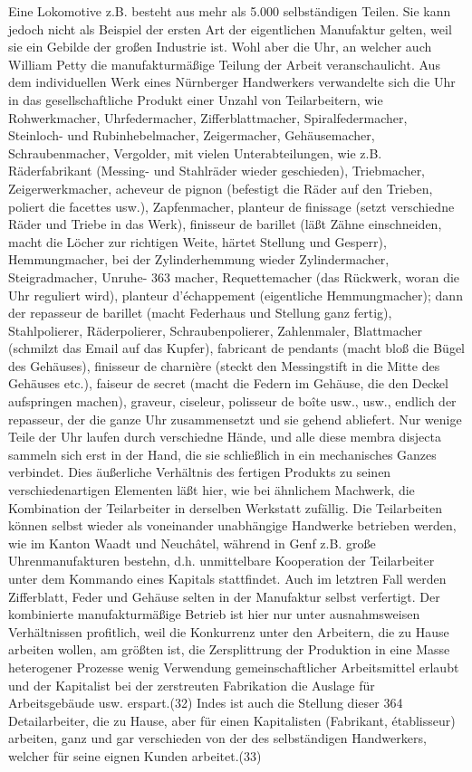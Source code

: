{Eine Lokomotive z.B. besteht aus mehr als 5.000 selbständigen Teilen.
Sie kann jedoch nicht als Beispiel der ersten Art der eigentlichen
Manufaktur gelten, weil sie ein Gebilde der großen Industrie ist. Wohl
aber die Uhr, an welcher auch William Petty die manufakturmäßige Teilung
der Arbeit veranschaulicht. Aus dem individuellen Werk eines Nürnberger
Handwerkers verwandelte sich die Uhr in das gesellschaftliche Produkt
einer Unzahl von Teilarbeitern, wie Rohwerkmacher, Uhrfedermacher,
Zifferblattmacher, Spiralfedermacher, Steinloch- und Rubinhebelmacher,
Zeigermacher, Gehäusemacher, Schraubenmacher, Vergolder, mit vielen
Unterabteilungen, wie z.B. Räderfabrikant (Messing- und Stahlräder
wieder geschieden), Triebmacher, Zeigerwerkmacher, acheveur de pignon
(befestigt die Räder auf den Trieben, poliert die facettes usw.),
Zapfenmacher, planteur de finissage (setzt verschiedne Räder und Triebe
in das Werk), finisseur de barillet (läßt Zähne einschneiden, macht die
Löcher zur richtigen Weite, härtet Stellung und Gesperr), Hemmungmacher,
bei der Zylinderhemmung wieder Zylindermacher, Steigradmacher, Unruhe-
\num{363} macher, Requettemacher (das Rückwerk, woran
die Uhr reguliert wird), planteur d'échappement (eigentliche
Hemmungmacher); dann der repasseur de barillet (macht Federhaus und
Stellung ganz fertig), Stahlpolierer, Räderpolierer, Schraubenpolierer,
Zahlenmaler, Blattmacher (schmilzt das Email auf das Kupfer), fabricant
de pendants (macht bloß die Bügel des Gehäuses), finisseur de charnière
(steckt den Messingstift in die Mitte des Gehäuses etc.), faiseur de
secret (macht die Federn im Gehäuse, die den Deckel aufspringen machen),
graveur, ciseleur, polisseur de boîte usw., usw., endlich der repasseur,
der die ganze Uhr zusammensetzt und sie gehend abliefert. Nur wenige
Teile der Uhr laufen durch verschiedne Hände, und alle diese membra
disjecta sammeln sich erst in der Hand, die sie schließlich in ein
mechanisches Ganzes verbindet. Dies äußerliche Verhältnis des fertigen
Produkts zu seinen verschiedenartigen Elementen läßt hier, wie bei
ähnlichem Machwerk, die Kombination der Teilarbeiter in derselben
Werkstatt zufällig. Die Teilarbeiten können selbst wieder als
voneinander unabhängige Handwerke betrieben werden, wie im Kanton Waadt
und Neuchâtel, während in Genf z.B. große Uhrenmanufakturen bestehn,
d.h. unmittelbare Kooperation der Teilarbeiter unter dem Kommando eines
Kapitals stattfindet. Auch im letztren Fall werden Zifferblatt, Feder
und Gehäuse selten in der Manufaktur selbst verfertigt. Der kombinierte
manufakturmäßige Betrieb ist hier nur unter ausnahmsweisen Verhältnissen
profitlich, weil die Konkurrenz unter den Arbeitern, die zu Hause
arbeiten wollen, am größten ist, die Zersplittrung der Produktion in
eine Masse heterogener Prozesse wenig Verwendung gemeinschaftlicher
Arbeitsmittel erlaubt und der Kapitalist bei der zerstreuten Fabrikation
die Auslage für Arbeitsgebäude usw. erspart.(32) Indes ist auch die
Stellung dieser \num{364} Detailarbeiter, die zu
Hause, aber für einen Kapitalisten (Fabrikant, établisseur) arbeiten,
ganz und gar verschieden von der des selbständigen Handwerkers, welcher
für seine eignen Kunden arbeitet.(33)

}

